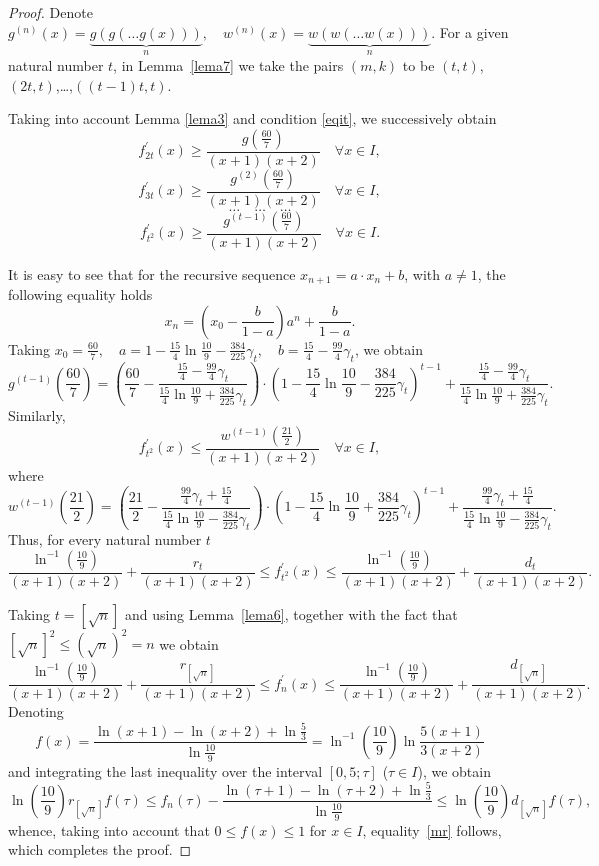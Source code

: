 \documentclass[10pt,a4paper]{amsart}
\begin{document}
\begin{proof}
Denote $g^{(n)}(x)=\underbrace{g(g(\ldots g(x)))}_{n},\quad w^{(n)}(x)=\underbrace{w(w(\ldots w(x)))}_{n}.
$
For a given natural number $t$, in Lemma~\ref{lema7} we take the pairs $(m,k)$ to be $(t,t)$,$(2t,t)$,\ldots,$((t-1)t,t).$

Taking into account Lemma \ref{lema3} and condition \eqref{eqit}, we successively obtain
$$
f_{2t}^\prime(x)\geq\frac{g(\frac{60}{7})}{(x+1)(x+2)} \quad \forall x\in I,
$$
$$
f_{3t}^\prime(x)\geq\frac{g^{(2)}(\frac{60}{7})}{(x+1)(x+2)} \quad \forall x\in I,
$$
$$
\ldots \quad \ldots \quad \ldots
$$
$$
f_{t^2}^\prime(x)\geq\frac{g^{(t-1)}(\frac{60}{7})}{(x+1)(x+2)} \quad \forall x\in I.
$$

It is easy to see that for the recursive sequence $x_{n+1}=a\cdot x_n+b$, with $a\neq1$, the following equality holds 
$$
x_n=\left(x_0-\frac{b}{1-a}\right)a^n+\frac{b}{1-a}.
$$
Taking $x_{0}=\frac{60}{7}, \quad a=1-\frac{15}{4}\ln\frac{10}{9}-\frac{384}{225}\gamma_t,  \quad b=\frac{15}{4}-\frac{99}{4}\gamma_t$, we obtain
$$
g^{(t-1)}(\frac{60}{7})=\left(\frac{60}{7}-\frac{\frac{15}{4}-\frac{99}{4}\gamma_t}{\frac{15}{4}
\ln\frac{10}{9}+\frac{384}{225}\gamma_t}\right)\cdot \left(1-\frac{15}{4}\ln\frac{10}{9}-\frac{384}{225}\gamma_t\right)^{t-1}+
\frac{\frac{15}{4}-\frac{99}{4}\gamma_t}{\frac{15}{4}\ln\frac{10}{9}+\frac{384}{225}\gamma_t}.
$$
Similarly,
$$
f_{t^2}^\prime(x)\leq\frac{w^{(t-1)}(\frac{21}{2})}{(x+1)(x+2)} \quad \forall x\in I,
$$
where
$$
w^{(t-1)}(\frac{21}{2})=\left(\frac{21}{2}-\frac{\frac{99}{4}\gamma_t+
\frac{15}{4}}{\frac{15}{4}\ln\frac{10}{9}-\frac{384}{225}\gamma_t}\right)\cdot \left(1-\frac{15}{4}\ln\frac{10}{9}+\frac{384}{225}\gamma_t\right)^{t-1}+
 \frac{\frac{99}{4}\gamma_{t}+\frac{15}{4}}{\frac{15}{4}\ln\frac{10}{9}-\frac{384}{225}\gamma_t}.
$$
Thus, for every natural number $t$
$$
\frac{\ln^{-1}\left(\frac{10}{9}\right)}{(x+1)(x+2)}+\frac{r_t}{(x+1)(x+2)}\leq f_{t^2}^\prime(x)\leq\frac{\ln^{-1}\left(\frac{10}{9}\right)}{(x+1)(x+2)}+\frac{d_t}{(x+1)(x+2)}.
$$

Taking $t=[\sqrt{n} ]$ and using Lemma~\eqref{lema6}, together with the fact that $[\sqrt{n}]^2\leq(\sqrt{n})^2=n$ we obtain
$$
\frac{\ln^{-1}\left(\frac{10}{9}\right)}{(x+1)(x+2)}+\frac{r_{[\sqrt{n}]}}{(x+1)(x+2)}\leq f_{n}^\prime(x)\leq\frac{\ln^{-1}\left(\frac{10}{9}\right)}{(x+1)(x+2)}+\frac{d_{[\sqrt{n}]}}{(x+1)(x+2)}.
$$
Denoting
$$f(x)=\frac{\ln\left(x+1\right)-\ln\left(x+2\right)+\ln\frac{5}{3}}{\ln\frac{10}{9}}=
\ln^{-1}\left(\frac{10}{9}\right)\ln\frac{5(x+1)}{3(x+2)}$$
and integrating the last inequality over the interval $[0,5;\tau]$ ($\tau \in I$), we obtain
 $$
\ln\left(\frac{10}{9}\right)r_{[\sqrt{n}]}f(\tau)\leq f_n(\tau)-\frac{\ln\left(\tau+1\right)-\ln\left(\tau+2\right)+\ln\frac{5}{3}}{\ln\frac{10}{9}}\leq\ln\left(\frac{10}{9}\right)
d_{[\sqrt{n}]}f(\tau),
$$
whence, taking into account that $0\leq f(x)\leq 1$ for  $x\in I$, equality~\eqref{mr} follows, which completes the proof.
\end{proof}
\end{document}
